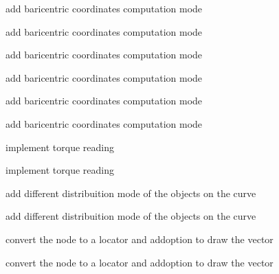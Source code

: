 
\begin{DoxyRefList}
\item[\label{todo__todo000001}%
\hypertarget{todo__todo000001}{}%
Class \hyperlink{class_m_g__cache_value}{M\-G\-\_\-cache\-Value} ]add baricentric coordinates computation mode

add baricentric coordinates computation mode 
\item[\label{todo__todo000002}%
\hypertarget{todo__todo000002}{}%
Class \hyperlink{class_m_g__curve}{M\-G\-\_\-curve} ]add baricentric coordinates computation mode

add baricentric coordinates computation mode 
\item[\label{todo__todo000003}%
\hypertarget{todo__todo000003}{}%
Class \hyperlink{class_m_g__poly_rivet}{M\-G\-\_\-poly\-Rivet} ]add baricentric coordinates computation mode

add baricentric coordinates computation mode 
\item[\label{todo__todo000004}%
\hypertarget{todo__todo000004}{}%
Class \hyperlink{class_m_g__pose_reader}{M\-G\-\_\-pose\-Reader} ]implement torque reading

implement torque reading 
\item[\label{todo__todo000005}%
\hypertarget{todo__todo000005}{}%
Class \hyperlink{class_m_g__spline_path}{M\-G\-\_\-spline\-Path} ]add different distribuition mode of the objects on the curve

add different distribuition mode of the objects on the curve 
\item[\label{todo__todo000011}%
\hypertarget{todo__todo000011}{}%
Class \hyperlink{class_m_g__vector}{M\-G\-\_\-vector} ]convert the node to a locator and addoption to draw the vector

convert the node to a locator and addoption to draw the vector
\end{DoxyRefList}